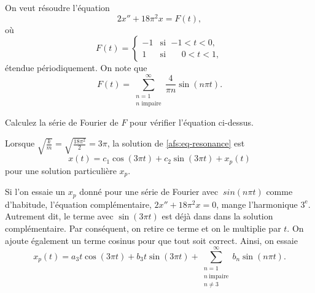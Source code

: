 \begin{example}
On veut résoudre l'équation
\begin{equation} \label{afs:eq-resonance}
2 x'' + 18 \pi^2 x = F(t) ,
\end{equation}
où
\begin{equation*}
F(t) =
\begin{cases}
-1 & \text{si } \; {-1} < t < 0 , \\
1 & \text{si } \; \phantom{-}0 < t < 1 ,
\end{cases}
\end{equation*}
étendue périodiquement.  On note que
\begin{equation*}
F(t) =
\sum_{\substack{n=1 \\ n \text{ impaire}}}^\infty
\frac{4}{\pi n}
\sin (n \pi t) . 
\end{equation*}

\begin{exercise}
Calculez la série de Fourier de $F$ pour vérifier l'équation ci-dessus.
\end{exercise}

Lorsque $\sqrt{\frac{k}{m}} = \sqrt{\frac{18\pi^2}{2}} = 3\pi$,
la solution de \eqref{afs:eq-resonance} est
\begin{equation*}
x(t) = c_1 \cos  (3\pi t) + c_2 \sin (3\pi t) + x_p (t)
\end{equation*}
pour une solution particulière $x_p$.

Si l'on essaie un $ x_p $ donné pour une série de Fourier avec $ \ sin (n \pi t) $ comme d'habitude,
l'équation complémentaire, $ 2x''  + 18 \pi ^2x = 0 $, mange  l'harmonique $3 ^ \text{e} $. Autrement dit, le terme
avec $ \sin (3 \pi t) $
est déjà dans dans la solution complémentaire.
Par conséquent, on retire ce terme et
on le multiplie par $ t $. On ajoute également un terme cosinus pour que tout soit correct.
Ainsi, on essaie
\begin{equation*}
x_p(t) =
a_3
t \cos (3 \pi t )
+
b_3
t \sin (3 \pi t)
+
\sum_{\substack{n=1 \\ n~\text{impaire} \\ n\not= 3}}^\infty
b_n
\sin (n \pi t) . 
\end{equation*}


\end{example}
